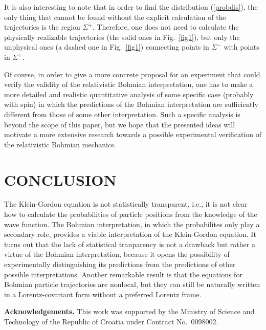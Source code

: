 \documentclass[11pt]{article}
\begin{document}
It is also interesting to note that in order to find the distribution 
(\ref{probdis}), the only thing that cannot be found without 
the explicit calculation of the trajectories is the region $\Sigma^+$.
Therefore, one does not need to calculate the physically 
realizable trajectories (the solid ones in Fig.~\ref{fig1}), but only 
the unphysical ones (a dashed one in Fig.~\ref{fig1}) connecting 
points in $\Sigma^-$ with points in $\Sigma^+$. 

Of course, in order to give a more concrete proposal for an experiment
that could verify the validity of the relativistic Bohmian interpretation,
one has to make a more detailed and realistic
quantitative analysis of some specific case (probably with spin) 
in which
the predictions of the Bohmian interpretation are sufficiently different
from those of some other interpretation. Such a specific
analysis is beyond the scope of this paper, but
we hope that the presented ideas will motivate a more extensive research
towards a possible experimental verification of the relativistic
Bohmian mechanics.  


\section{CONCLUSION}
\label{secCon}

The Klein-Gordon equation is not statistically transparent, 
i.e., it is not clear how to calculate the probabilities 
of particle positions from the knowledge of the wave function.
The Bohmian interpretation, in which the probabilites only play 
a secondary role, provides a viable interpretation 
of the Klein-Gordon equation. It turns out that the 
lack of statistical 
tranparency is not a drawback but rather a virtue of 
the Bohmian interpretation, because it opens the possibility 
of experimentally distinguishing its predictions 
from the predictions of other possible interpretations. 
Another remarkable result is that 
the equations for Bohmian particle trajectories 
are nonlocal, but they can still be naturally  
written in a Lorentz-covariant 
form without a preferred Lorentz frame.  

\vspace{0.4cm}
\noindent
{\bf Acknowledgements.}
This work was supported by the Ministry of Science and Technology of the
Republic of Croatia under Contract No.~0098002.
\end{document}
